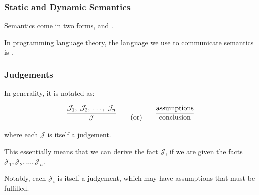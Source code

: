 \documentclass[aspectratio=169, handout]{beamer}
\begin{document}
\begin{frame}[fragile]
  \frametitle{Static and Dynamic Semantics}

  Semantics come in two forms,  and .

  \pause
  \vspace{\fill}


  \pause
  \vspace{\fill}


  \pause
  \vspace{\fill}

  In programming language theory, the language we use to communicate
  semantics is .
\end{frame}

\begin{frame}[fragile]
  \frametitle{Judgements}


  \pause
  \vspace{\fill}

  In generality, it is notated as:

  {\large
  \[
    \infer{\mathcal{J}}{\mathcal{J}_1,\; \mathcal{J}_2,\; \dots,\; \mathcal{J}_n}
    \qquad \text{(or)} \qquad
    \infer{\text{conclusion}}{\text{assumptions}}
  \]
  }

  where each $\mathcal{J}$ is itself a judgement.

  \pause
  \vspace{\fill}

  This essentially means that we can derive the fact $\mathcal{J}$,
  if we are given the facts $\mathcal{J}_1, \mathcal{J}_2, \dots, \mathcal{J}_n$.

  \pause
  \vspace{\fill}

  Notably, each $\mathcal{J}_i$ is itself a judgement, which may have assumptions
  that must be fulfilled.

\end{frame}
\end{document}
